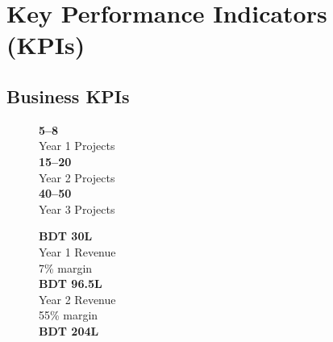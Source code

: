 
\chapter{Key Performance Indicators (KPIs)}

\section{Business KPIs}

\begin{figure}[H]
    \centering
    \noindent
    \begin{minipage}[t]{0.32\textwidth}
        \begin{tcolorbox}[colback=BoxBlue,colframe=PrimaryBlue,arc=5pt,boxrule=1pt,
            halign=center,top=6pt,bottom=6pt]
            {\large\bfseries\color{PrimaryBlue}5--8}\\
            {\footnotesize\color{DarkGrey}Year 1 Projects}\\[4pt]
            {\large\bfseries\color{SecondaryBlue}15--20}\\
            {\footnotesize\color{DarkGrey}Year 2 Projects}\\[4pt]
            {\large\bfseries\color{AccentGreen}40--50}\\
            {\footnotesize\color{DarkGrey}Year 3 Projects}
        \end{tcolorbox}
    \end{minipage}\hfill
    \begin{minipage}[t]{0.32\textwidth}
        \begin{tcolorbox}[colback=BoxGreen,colframe=AccentGreen,arc=5pt,boxrule=1pt,
            halign=center,top=6pt,bottom=6pt]
            {\large\bfseries\color{DarkGrey}BDT 30L}\\
            {\footnotesize\color{DarkGrey}Year 1 Revenue\\7\% margin}\\[4pt]
            {\large\bfseries\color{SecondaryBlue}BDT 96.5L}\\
            {\footnotesize\color{DarkGrey}Year 2 Revenue\\55\% margin}\\[4pt]
            {\large\bfseries\color{AccentGreen}BDT 204L}\\

\end{tcolorbox}
\end{minipage}
\end{figure}
